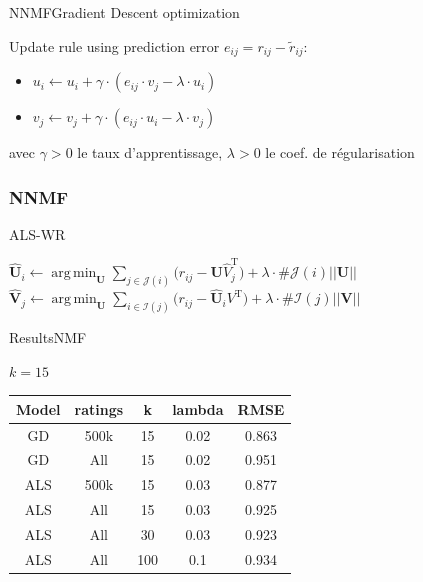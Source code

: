 \documentclass{beamer} %
\DeclareMathOperator*{\argmin}{arg\,min}
\begin{document}
\begin{frame}{NNMF}{Gradient Descent optimization}

Update rule using prediction error $e_{ij} = r_{ij} - \tilde{r}_{ij}$:
\begin{itemize}
\item $u_i \leftarrow u_i + \gamma \cdot (e_{ij} \cdot v_j - \lambda \cdot u_i)$
\item $v_j \leftarrow v_j + \gamma \cdot (e_{ij} \cdot u_i - \lambda \cdot v_j)$
\end{itemize}
avec $\gamma > 0$ le taux d'apprentissage, $\lambda > 0$ le coef. de régularisation

\vspace{20pt}
	
\end{frame}

\begin{frame}%
    \frametitle{NNMF}
    \begin{algorithm}[H]
	\caption{ALS-WR}
	\label{disc1}
	\begin{algorithmic}[1]
        \STATE $\hat{\bm{U}}_i \leftarrow \argmin_{\bm{U}} \sum_{j \in \mathcal{J}(i)} \big ( r_{ij} - \bm{U}\hat{V}_j^\mathrm{T} ) + \lambda \cdot \# \mathcal{J}(i) ||\bm{U} ||$ 
        \ENDFOR
        \STATE $\hat{\bm{V}}_j \leftarrow \argmin_{\bm{U}} \sum_{i \in \mathcal{I}(j)} \big ( r_{ij} - \hat{\bm{U}}_i{V}^\mathrm{T} ) + \lambda \cdot \# \mathcal{I}(j) ||\bm{V} ||$ 
        \STATE
        \ENDFOR
	  \ENDWHILE
	\end{algorithmic}
	\end{algorithm}
  \end{frame}


\begin{frame}{Results}{NMF}

$k = 15$

\begin{center}
    \begin{tabular}{|c|c|c|c|c|}
       \hline
       Model & ratings & k & lambda  & RMSE \\
       \hline
       GD  & 500k & 15 & 0.02 & 0.863 \\
	   GD & All & 15 & 0.02 &  0.951 \\
       ALS & 500k & 15 & 0.03 & 0.877 \\
	   ALS & All &  15  &  0.03 & 0.925 \\
       ALS & All & 30 & 0.03 &  0.923 \\
   	   ALS & All &  100  &  0.1 &   0.934 \\
       \hline
    \end{tabular}
  \end{center}

\end{frame}
\end{document}
